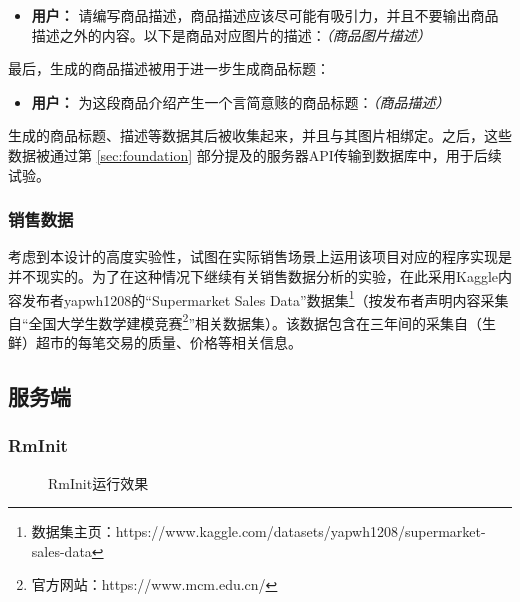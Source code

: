 \begin{itemize}
    \item[] \textbf{用户：} 请编写商品描述，商品描述应该尽可能有吸引力，并且不要输出商品描述之外的内容。以下是商品对应图片的描述：\textit{（商品图片描述）}
\end{itemize}

最后，生成的商品描述被用于进一步生成商品标题：

\begin{itemize}
    \item[] \textbf{用户：} 为这段商品介绍产生一个言简意赅的商品标题：\textit{（商品描述）}
\end{itemize}

生成的商品标题、描述等数据其后被收集起来，并且与其图片相绑定。之后，这些数据被通过第 \ref{sec:foundation} 部分提及的服务器API传输到数据库中，用于后续试验。

\subsubsection{销售数据}

考虑到本设计的高度实验性，试图在实际销售场景上运用该项目对应的程序实现是并不现实的。为了在这种情况下继续有关销售数据分析的实验，在此采用Kaggle内容发布者yapwh1208的“Supermarket Sales Data”数据集\footnote{数据集主页：https://www.kaggle.com/datasets/yapwh1208/supermarket-sales-data}（按发布者声明内容采集自“全国大学生数学建模竞赛\footnote{官方网站：https://www.mcm.edu.cn/}”相关数据集）。该数据包含在三年间的采集自（生鲜）超市的每笔交易的质量、价格等相关信息。

\subsection{服务端}

\subsubsection{RmInit}

\begin{figure}[htbp]
    \hfill
	\caption{RmInit运行效果}
	\label{fig:rminit}
\end{figure}

